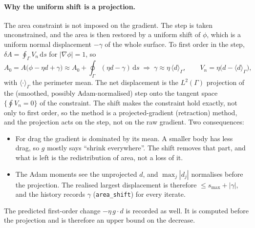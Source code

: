 \documentclass[11pt,a4paper]{article}
\numberwithin{equation}{section}
\newcommand{\code}[1]{\texttt{#1}}
\newcommand{\dd}{\mathrm{d}}
\begin{document}
\paragraph{Why the uniform shift is a projection.}
The area constraint is not imposed on the gradient.  The step is taken
unconstrained, and the area is then restored by a uniform shift of $\phi$, which is
a uniform normal displacement $-\gamma$ of the whole surface.  To first order in the
step, $\delta A = \oint_\Gamma V_n\,\dd s$ for $|\nabla\phi| = 1$, so
\[
A_0 = A\big(\phi - \eta d + \gamma\big) \approx A_0 + \oint_\Gamma (\eta d - \gamma)\,\dd s
\;\Rightarrow\;
\gamma \approx \eta\,\langle d\rangle_\Gamma,
\qquad
V_n = \eta\big(d - \langle d\rangle_\Gamma\big),
\]
with $\langle\cdot\rangle_\Gamma$ the perimeter mean.  The net displacement is the
$L^2(\Gamma)$ projection of the (smoothed, possibly Adam-normalised) step onto the
tangent space $\{\oint V_n = 0\}$ of the constraint.  The shift makes the constraint
hold exactly, not only to first order, so the method is a projected-gradient
(retraction) method, and the projection acts on the step, not on the raw gradient.
Two consequences:
\begin{itemize}
\item For drag the gradient is dominated by its mean.  A smaller body has less drag,
  so $g$ mostly says ``shrink everywhere''.  The shift removes that part, and what is
  left is the redistribution of area, not a loss of it.
\item The Adam moments see the unprojected $d$, and $\max_j|d_j|$ normalises before
  the projection.  The realised largest displacement is therefore
  $\le s_{\max} + |\gamma|$, and the history records $\gamma$
  (\code{area\_shift}) for every iterate.
\end{itemize}
The predicted first-order change $-\eta\, g\cdot d$ is recorded as well.  It is
computed before the projection and is therefore an upper bound on the decrease.
\end{document}
